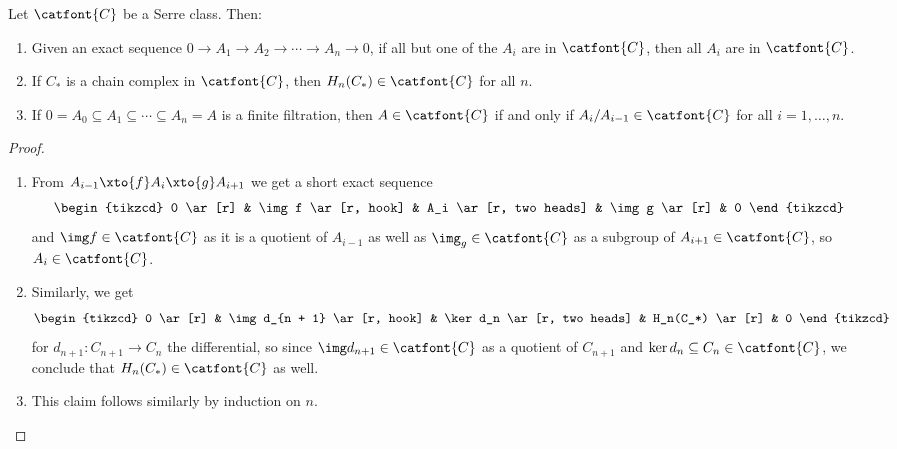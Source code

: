 \begin{lemma}\label{lmm:serreclasssequences}
	Let $\catfont{C}$ be a Serre class.
	Then:
	\begin{enumerate}
		\item Given an exact sequence $0 \to A_1 \to A_2 \to \cdots \to A_n \to 0$, if all but one of the $A_i$ are in $\catfont{C}$, then all $A_i$ are in $\catfont{C}$.
		\item If $C_*$ is a chain complex in $\catfont{C}$, then $H_n(C_*) \in \catfont{C}$ for all $n$.
		\item If $0 = A_0 \subseteq A_1 \subseteq \cdots \subseteq A_n = A$ is a finite filtration, then $A \in \catfont{C}$ if and only if $A_i / A_{i - 1} \in \catfont{C}$ for all $i = 1, \ldots, n$.
	\end{enumerate}
\end{lemma}
\begin{proof}
	\leavevmode
	\begin{enumerate}
		\item From $A_{i - 1} \xto{f} A_i \xto{g} A_{i + 1}$ we get a short exact sequence
			\begin{equation*}
				\begin{tikzcd}
					0 
							\ar[r]
						& \img f
							\ar[r, hook]
						& A_i
							\ar[r, two heads]
						& \img g
							\ar[r]
						& 0
				\end{tikzcd}
			\end{equation*}
			and $\img f \in \catfont{C}$ as it is a quotient of $A_{i - 1}$ as well as $\img_g \in \catfont{C}$ as a subgroup of $A_{i + 1} \in \catfont{C}$, so $A_i \in \catfont{C}$.
		\item Similarly, we get
			\begin{equation*}
				\begin{tikzcd}
					0 
							\ar[r]
						& \img d_{n + 1}
							\ar[r, hook]
						& \ker d_n
							\ar[r, two heads]
						& H_n(C_*)
							\ar[r]
						& 0
				\end{tikzcd}
			\end{equation*}
			for $d_{n + 1}\colon C_{n + 1} \to C_n$ the differential, so since $\img d_{n + 1} \in \catfont{C}$ as a quotient of $C_{n + 1}$ and $\ker d_n \subseteq C_n \in \catfont{C}$, we conclude that $H_n(C_*) \in \catfont{C}$ as well.
		\item This claim follows similarly by induction on $n$.
			\qedhere
	\end{enumerate}
\end{proof}

